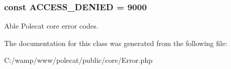 \subsubsection[{A\+C\+C\+E\+S\+S\+\_\+\+D\+E\+N\+I\+E\+D}]{\setlength{\rightskip}{0pt plus 5cm}const A\+C\+C\+E\+S\+S\+\_\+\+D\+E\+N\+I\+E\+D = 9000}\label{class_able_polecat___error_a58ceb882042acb8eea73d1c9a9b8feff}
Able Polecat core error codes. 

The documentation for this class was generated from the following file\+:\begin{DoxyCompactItemize}
\item 
C\+:/wamp/www/polecat/public/core/Error.\+php\end{DoxyCompactItemize}
